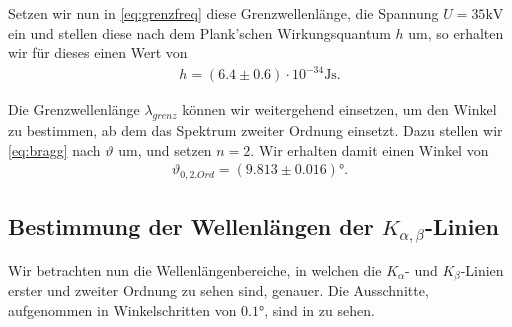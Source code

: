 Setzen wir nun in \eqref{eq:grenzfreq} diese Grenzwellenlänge, die Spannung $U = 35\si{\kilo\volt}$ ein und stellen diese nach dem Plank'schen Wirkungsquantum $h$ um, so erhalten wir für dieses einen Wert von
\begin{align}
  h = (6.4 \pm 0.6) \cdot 10^{-34} \si{\joule\second}.
\end{align}

Die Grenzwellenlänge $\lambda_{grenz}$ können wir weitergehend einsetzen, um den Winkel zu bestimmen, ab dem das Spektrum zweiter Ordnung einsetzt. Dazu stellen wir \eqref{eq:bragg} nach $\vartheta$ um, und setzen $n = 2$. Wir erhalten damit einen Winkel von
\begin{align}
  \vartheta_{0,2. Ord} = (9.813 \pm 0.016)\si{\degree}.
\end{align}

\subsection{Bestimmung der Wellenlängen der $K_{\alpha,\beta}$-Linien}

Wir betrachten nun die Wellenlängenbereiche, in welchen die $K_{\alpha}$- und $K_{\beta}$-Linien erster und zweiter Ordnung zu sehen sind, genauer. Die Ausschnitte, aufgenommen in Winkelschritten von $0.1\si{\degree}$, sind in  zu sehen.

